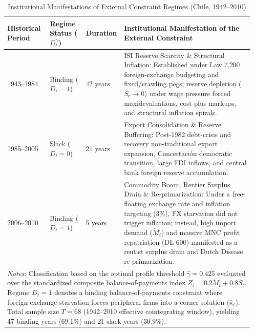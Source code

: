 \begin{table}[h!]
	\centering
	\caption{Institutional Manifestations of External Constraint Regimes (Chile, 1942--2010)}
	\label{tab:chile_binding_regimes}
	\small
	\begin{tabular}{p{2.0cm} p{1.8cm} p{1.0cm} p{7.2cm}}
		\hline
		Historical Period & Regime Status ($D_t^\gamma$) & Duration & Institutional Manifestation of the External Constraint \\
		\hline
		1943--1984 & Binding ($D_t = 1$) & 42 years & ISI Reserve Scarcity \& Structural Inflation: Established under Law 7,200 foreign-exchange budgeting and fixed/crawling pegs; reserve depletion ($S_t \to 0$) under wage pressure forced maxidevaluations, cost-plus markups, and structural inflation spirals. \\
		\hline
		1985--2005 & Slack ($D_t = 0$) & 21 years & Export Consolidation \& Reserve Buffering: Post-1982 debt-crisis and recovery non-traditional export expansion, Concertación democratic transition, large FDI inflows, and central bank foreign reserve accumulation. \\
		\hline
		2006--2010 & Binding ($D_t = 1$) & 5 years & Commodity Boom, Rentier Surplus Drain \& Re-primarization: Under a free-floating exchange rate and inflation targeting (3\%), FX starvation did not trigger inflation; instead, high import demand ($\tilde{M}_t$) and massive MNC profit repatriation (DL 600) manifested as a rentist surplus drain and Dutch Disease re-primarization. \\
		\hline
		\multicolumn{4}{p{14.2cm}}{\footnotesize \textit{Notes:} Classification based on the optimal profile threshold $\hat{\gamma} = 0.425$ evaluated over the standardized composite balance-of-payments index $Z_t = 0.2 \tilde{M}_t + 0.8 \tilde{S}_t$. Regime $D_t = 1$ denotes a binding balance-of-payments constraint where foreign-exchange starvation forces peripheral firms into a corner solution ($\bar{\kappa}_t$). Total sample size $T = 68$ (1942--2010 effective cointegrating window), yielding 47 binding years ($69.1\%$) and 21 slack years ($30.9\%$).} \\
	\end{tabular}
\end{table}